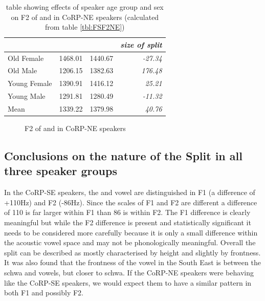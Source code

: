 \documentclass[../../../00.FullDoc/tex/APRReport-year4]{subfiles}
\begin{document}
\begin{table}[htbp]
	\centering
	\begin{tabular}{lrrr}
		\hline
		& \multicolumn{1}{l}{\foot{}} & \multicolumn{1}{l}{\strutt{}} & \multicolumn{1}{l}{\textit{size of split}} \\
		\hline
		Old Female & 1468.01 & 1440.67 & \textit{-27.34} \\
		Old Male & 1206.15 & 1382.63 & \textit{176.48} \\
		Young Female & 1390.91 & 1416.12 & \textit{25.21} \\
		Young Male & 1291.81 & 1280.49 & \textit{-11.32} \\
		Mean  & 1339.22 & 1379.98 & \textit{40.76} \\
		\hline
	\end{tabular}%
	\caption{table showing effects of speaker age group and sex on F2 of \foot{} and \strutt{} in CoRP-NE speakers (calculated from table \ref{tbl:FSF2NE})}
	\label{tbl:FSF2NEinter}
	\end{table}%

\begin{figure}[h]
	
	\caption{F2 of \foot{} and \strutt{} in CoRP-NE speakers} \label{fig:FSF2NE}
\end{figure}


\subsection{Conclusions on the nature of the \FS{} Split in all three speaker groups}
In the CoRP-SE speakers, the \foot{} and \strutt{} vowel are distinguished in F1 (a difference of +110Hz) and F2 (-86Hz). Since the scales of F1 and F2 are different a difference of 110 is far larger within F1 than 86 is within F2. The F1 difference is clearly meaningful but while the F2 difference is present and statistically significant it needs to be considered more carefully because it is only a small difference within the acoustic vowel space and may not be phonologically meaningful. Overall the \FS split can be described as mostly characterised by height and slightly by frontness. It was also found that the frontness of the \strutt{} vowel in the South East is between the schwa and  vowels, but closer to schwa. If the CoRP-NE speakers were behaving like the CoRP-SE speakers, we would expect them to have a similar pattern in both F1 and possibly F2.
\end{document}
